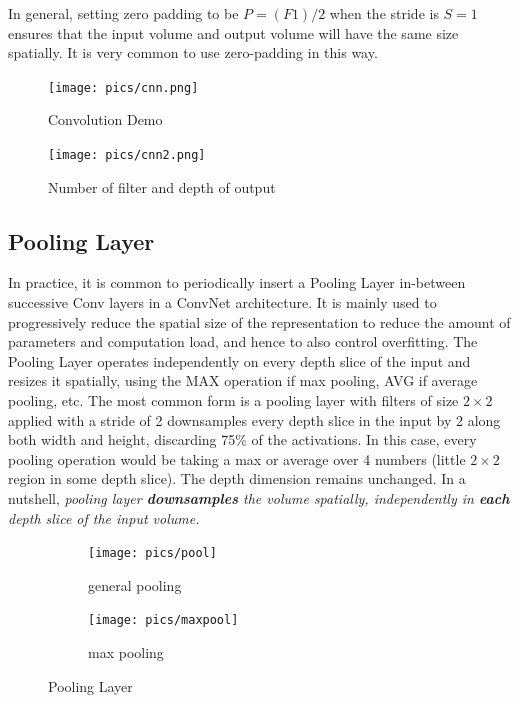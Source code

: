 \documentclass[twoside]{article}
\begin{document}
In general, setting zero padding to be $P=(F1)/2$ when the stride is $S=1$ ensures that the input volume and output volume will have the same size spatially. It is very common to use zero-padding in this way.

\begin{figure}[!htb]
\centering
\texttt{[image: pics/cnn.png]}
\caption{Convolution Demo\cite{cs231n-website}}
\label{fig:conv_demo}
\end{figure}

\begin{figure}[!htb]
\centering
\texttt{[image: pics/cnn2.png]}
\caption{Number of filter and depth of output\cite{cs231n-website}}
\label{fig:conv_demo2}
\end{figure}
\subsection{Pooling Layer}
In practice, it is common to periodically insert a Pooling Layer in-between successive Conv layers in a ConvNet architecture. It is mainly used to progressively reduce the spatial size of the representation to reduce the amount of parameters and computation load, and hence to also control overfitting. The Pooling Layer operates independently on every depth slice of the input and resizes it spatially, using the MAX operation if max pooling, AVG if average pooling, etc. The most common form is a pooling layer with filters of size $2\times2$ applied with a stride of 2 downsamples every depth slice in the input by 2 along both width and height, discarding 75\% of the activations. In this case, every pooling operation would be taking a max or average over 4 numbers (little $2\times2$ region in some depth slice). The depth dimension remains unchanged. In a nutshell, \textit{pooling layer \textbf{downsamples} the volume spatially, independently in \textbf{each} depth slice of the input volume.}

\begin{figure}[!htb]
\begin{subfigure}[!htb]{0.45\linewidth}
\texttt{[image: pics/pool]}
\caption{general pooling}
\label{fig:genpool}
\end{subfigure}
\hfill
\begin{subfigure}[!htb]{0.54\linewidth}
\texttt{[image: pics/maxpool]}
\caption{max pooling}
\label{fig:maxpool}
\end{subfigure}
\caption{Pooling Layer\cite{cs231n-website}}
\end{figure}
\end{document}

